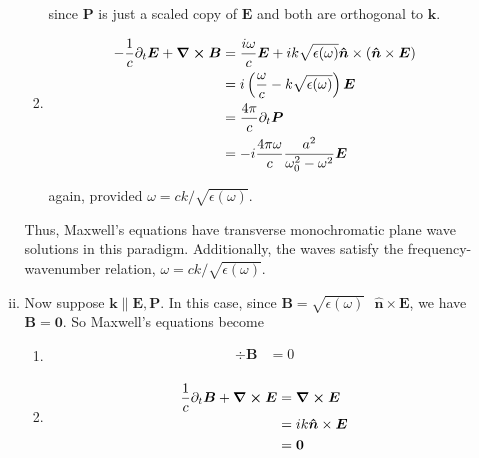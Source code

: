 \documentclass[]{article}
\begin{document}
\begin{enumerate}[a)]
\begin{enumerate}[(i)]
\begin{enumerate}[(M1)]
since $\bm{P}$ is just a scaled copy of $\bm{E}$ and both are orthogonal to $\bm{k}$.  \\

\item 

\begin{equation}
\begin{split}
-\frac{1}{c} \partial_t \bm{E}  + \curl \bm{B} & = \frac{ i \omega }{c} \bm{E} + i k\sqrt{ \epsilon(\omega)  }  \bm{\hat{n}} \times ( \bm{\hat{n}} \times \bm{E} ) \\
& = i \left( \frac{ \omega}{c}  - k\sqrt{ \epsilon(\omega)  }  \right) \bm{E} \\ 
& = \frac{ 4\pi}{c}  \partial_t \bm{P} \\
& = - i  \frac{ 4\pi \omega }{c} \frac{ a^2 }{ \omega_0^2 - \omega^2} \bm{E} 
\end{split}
\end{equation}

again, provided $\omega = ck /\sqrt{ \epsilon(\omega)  } $. \\

\end{enumerate}

Thus, Maxwell's equations have transverse monochromatic plane wave solutions in this paradigm. Additionally, the waves satisfy the frequency-wavenumber relation, $ \omega = ck /\sqrt{ \epsilon(\omega)  } $. \\


\item Now suppose $\bm{k} \parallel \bm{E}, \bm{P}$. In this case, since $\bm{B} = \sqrt{\epsilon(\omega)} \text{ }\bm{\hat{n}} \times \bm{E}$, we have $\bm{B} = \bm{0}$. So Maxwell's equations become \\ 


\begin{enumerate}[(M1)]

\item

\begin{equation}
\begin{split}
\div \bm{B} & = 0 \\
\end{split}
\end{equation}


\item 

\begin{equation}
\begin{split}
\frac{1}{c} \partial_t \bm{B} + \curl \bm{E} & = \curl \bm{E} \\ 
& = i k \bm{\hat{n}} \times \bm{E}  \\
& = \bm{0} \\ 
\end{split}
\end{equation}


\end{enumerate}
\end{enumerate}
\end{enumerate}
\end{document}
